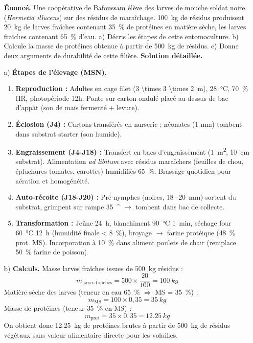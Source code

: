 \documentclass[11pt]{article}
\providecommand{\degree}{^{\circ}}
\begin{document}
\begin{exoresolu}
\textbf{Énoncé.} Une coopérative de Bafoussam élève des larves de mouche soldat noire (\emph{Hermetia illucens}) sur des résidus de maraîchage. \SI{100}{kg} de résidus produisent \SI{20}{kg} de larves fraîches contenant \SI{35}{\percent} de protéines en matière sèche, les larves fraîches contenant \SI{65}{\percent} d'eau. a) Décris les étapes de cette entomoculture. b) Calcule la masse de protéines obtenue à partir de \SI{500}{kg} de résidus. c) Donne deux arguments de durabilité de cette filière.
\tcblower
\textbf{Solution détaillée.}

a) \textbf{Étapes de l'élevage (MSN).}
\begin{enumerate}
\item \textbf{Reproduction :} Adultes en cage filet (\SI{3 \times 3 \times 2}{m}), \SI{28}{\celsius}, \SI{70}{\percent} HR, photopériode 12h. Ponte sur carton ondulé placé au-dessus de bac d'appât (son de maïs fermenté + levure).
\item \textbf{Éclosion (J4) :} Cartons transférés en nurserie ; néonates (1 mm) tombent dans substrat starter (son humide).
\item \textbf{Engraissement (J4-J18) :} Transfert en bacs d'engraissement (\SI{1}{m^2}, \SI{10}{cm} substrat). Alimentation \emph{ad libitum} avec résidus maraîchers (feuilles de chou, épluchures tomates, carottes) humidifiés \SI{65}{\percent}. Brassage quotidien pour aération et homogénéité.
\item \textbf{Auto-récolte (J18-J20) :} Pré-nymphes (noires, \SI{18-20}{mm}) sortent du substrat, grimpent sur rampe \SI{35}{\degree} $\rightarrow$ tombent dans bac de collecte.
\item \textbf{Transformation :} Jeûne \SI{24}{h}, blanchiment \SI{90}{\celsius} \SI{1}{min}, séchage four \SI{60}{\celsius} \SI{12}{h} (humidité finale \SI{< 8}{\percent}), broyage $\rightarrow$ farine protéique (\SI{48}{\percent} prot. MS). Incorporation à \SI{10}{\percent} dans aliment poulets de chair (remplace \SI{50}{\percent} farine de poisson).
\end{enumerate}

b) \textbf{Calculs.}
Masse larves fraîches issues de \SI{500}{kg} résidus :
\[ m_{\text{larves fraîches}} = 500 \times \frac{20}{100} = \SI{100}{kg} \]
Matière sèche des larves (teneur en eau \SI{65}{\percent} $\Rightarrow$ MS = \SI{35}{\percent}) :
\[ m_{\text{MS}} = 100 \times 0,35 = \SI{35}{kg} \]
Masse de protéines (teneur \SI{35}{\percent} en MS) :
\[ m_{\text{prot}} = 35 \times 0,35 = \SI{12,25}{kg} \]
On obtient donc \SI{12,25}{kg} de protéines brutes à partir de \SI{500}{kg} de résidus végétaux sans valeur alimentaire directe pour les volailles.


\end{exoresolu}
\end{document}
